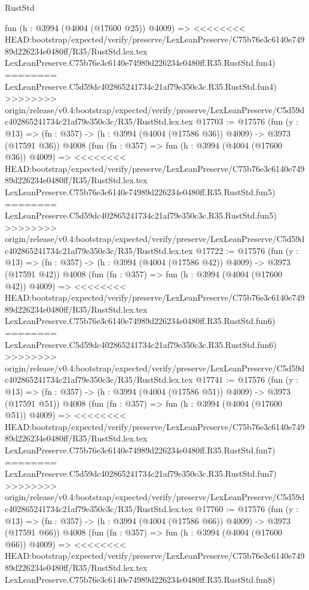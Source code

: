 \begin{lexlean}{RustStd}
\begin{coremodule}
{\begin{coremodule}
{{{{{{{{{{{{{{{{    fun (h : @3994 (@4004 (@17600 @25)) @4009) =>
<<<<<<<< HEAD:bootstrap/expected/verify/preserve/LexLeanPreserve/C75b76e3c6140e74989d226234e0480ff/R35/RustStd.lex.tex
    LexLeanPreserve.C75b76e3c6140e74989d226234e0480ff.R35.RustStd.fun4)
========
    LexLeanPreserve.C5d59dc402865241734c21af79e350c3c.R35.RustStd.fun4)
>>>>>>>> origin/release/v0.4:bootstrap/expected/verify/preserve/LexLeanPreserve/C5d59dc402865241734c21af79e350c3c/R35/RustStd.lex.tex
@17703 := @17576
    (fun (y : @13) => (fn : @357) -> (h : @3994 (@4004 (@17586 @36)) @4009) -> @3973 (@17591 @36))
    @4008
    (fun (fn : @357) =>
    fun (h : @3994 (@4004 (@17600 @36)) @4009) =>
<<<<<<<< HEAD:bootstrap/expected/verify/preserve/LexLeanPreserve/C75b76e3c6140e74989d226234e0480ff/R35/RustStd.lex.tex
    LexLeanPreserve.C75b76e3c6140e74989d226234e0480ff.R35.RustStd.fun5)
========
    LexLeanPreserve.C5d59dc402865241734c21af79e350c3c.R35.RustStd.fun5)
>>>>>>>> origin/release/v0.4:bootstrap/expected/verify/preserve/LexLeanPreserve/C5d59dc402865241734c21af79e350c3c/R35/RustStd.lex.tex
@17722 := @17576
    (fun (y : @13) => (fn : @357) -> (h : @3994 (@4004 (@17586 @42)) @4009) -> @3973 (@17591 @42))
    @4008
    (fun (fn : @357) =>
    fun (h : @3994 (@4004 (@17600 @42)) @4009) =>
<<<<<<<< HEAD:bootstrap/expected/verify/preserve/LexLeanPreserve/C75b76e3c6140e74989d226234e0480ff/R35/RustStd.lex.tex
    LexLeanPreserve.C75b76e3c6140e74989d226234e0480ff.R35.RustStd.fun6)
========
    LexLeanPreserve.C5d59dc402865241734c21af79e350c3c.R35.RustStd.fun6)
>>>>>>>> origin/release/v0.4:bootstrap/expected/verify/preserve/LexLeanPreserve/C5d59dc402865241734c21af79e350c3c/R35/RustStd.lex.tex
@17741 := @17576
    (fun (y : @13) => (fn : @357) -> (h : @3994 (@4004 (@17586 @51)) @4009) -> @3973 (@17591 @51))
    @4008
    (fun (fn : @357) =>
    fun (h : @3994 (@4004 (@17600 @51)) @4009) =>
<<<<<<<< HEAD:bootstrap/expected/verify/preserve/LexLeanPreserve/C75b76e3c6140e74989d226234e0480ff/R35/RustStd.lex.tex
    LexLeanPreserve.C75b76e3c6140e74989d226234e0480ff.R35.RustStd.fun7)
========
    LexLeanPreserve.C5d59dc402865241734c21af79e350c3c.R35.RustStd.fun7)
>>>>>>>> origin/release/v0.4:bootstrap/expected/verify/preserve/LexLeanPreserve/C5d59dc402865241734c21af79e350c3c/R35/RustStd.lex.tex
@17760 := @17576
    (fun (y : @13) => (fn : @357) -> (h : @3994 (@4004 (@17586 @66)) @4009) -> @3973 (@17591 @66))
    @4008
    (fun (fn : @357) =>
    fun (h : @3994 (@4004 (@17600 @66)) @4009) =>
<<<<<<<< HEAD:bootstrap/expected/verify/preserve/LexLeanPreserve/C75b76e3c6140e74989d226234e0480ff/R35/RustStd.lex.tex
    LexLeanPreserve.C75b76e3c6140e74989d226234e0480ff.R35.RustStd.fun8)
}}}}}}}}}}}}}}}}
\end{coremodule}}
\end{coremodule}
\end{lexlean}
